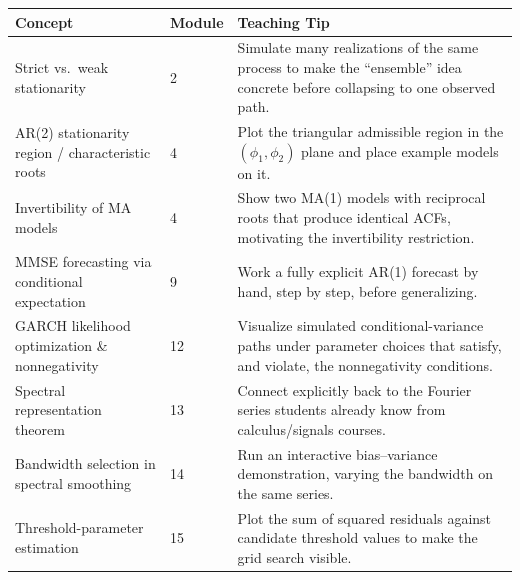 \documentclass[11pt]{article}
\begin{document}
\begin{longtable}{@{}p{4.3cm}p{1.6cm}p{7.3cm}@{}}
\toprule
\textbf{Concept} & \textbf{Module} & \textbf{Teaching Tip} \\
\midrule
\endhead
Strict vs.\ weak stationarity & 2 & Simulate many realizations of the same process to make the ``ensemble'' idea concrete before collapsing to one observed path. \\
AR(2) stationarity region / characteristic roots & 4 & Plot the triangular admissible region in the $(\phi_1,\phi_2)$ plane and place example models on it. \\
Invertibility of MA models & 4 & Show two MA(1) models with reciprocal roots that produce identical ACFs, motivating the invertibility restriction. \\
MMSE forecasting via conditional expectation & 9 & Work a fully explicit AR(1) forecast by hand, step by step, before generalizing. \\
GARCH likelihood optimization \& nonnegativity & 12 & Visualize simulated conditional-variance paths under parameter choices that satisfy, and violate, the nonnegativity conditions. \\
Spectral representation theorem & 13 & Connect explicitly back to the Fourier series students already know from calculus/signals courses. \\
Bandwidth selection in spectral smoothing & 14 & Run an interactive bias--variance demonstration, varying the bandwidth on the same series. \\
Threshold-parameter estimation & 15 & Plot the sum of squared residuals against candidate threshold values to make the grid search visible. \\
\bottomrule
\end{longtable}

\newpage
\end{document}
